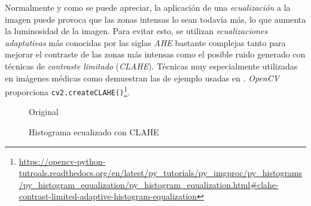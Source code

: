 Normalmente y como se puede apreciar, la aplicación de una
\emph{ecualización} a la imagen puede provoca que las zonas intensas
lo sean todavía más, lo que aumenta la luminosidad de la imagen. Para
evitar esto, se utilizan \emph{ecualizaciones adaptativas} más
conocidas por las siglas \emph{AHE} \emph{\citep*[Image enhancement
  techniques for cockpit displays]{ketcham1974image}} bastante
complejas tanto para mejorar el contraste de las zonas más intensas
como el posible ruido generado con técnicas de \emph{contraste
  limitado} (\emph{CLAHE}). Técnicas muy especialmente utilizadas en
imágenes médicas como demuestran las de ejemplo usadas en
\emph{\citep*[Adaptive histogram equalization and its
  variations]{pizer1987adaptive}}. \emph{OpenCV} proporciona
\texttt{cv2.createCLAHE()}\footnote{\url{https://opencv-python-tutroals.readthedocs.org/en/latest/py\_tutorials/py_imgproc/py\_histograms/py\_histogram_equalization/py\_histogram_equalization.html\#clahe-contrast-limited-adaptive-histogram-equalization}}.

\begin{figure}[H]
  \caption{Original}
  \centering \setlength\fboxsep{0pt} \setlength\fboxrule{0.5pt}
\end{figure}

\begin{figure}[H]
  \caption{Histograma ecualizado con CLAHE}
  \centering \setlength\fboxsep{0pt} \setlength\fboxrule{0.5pt}
\end{figure}

